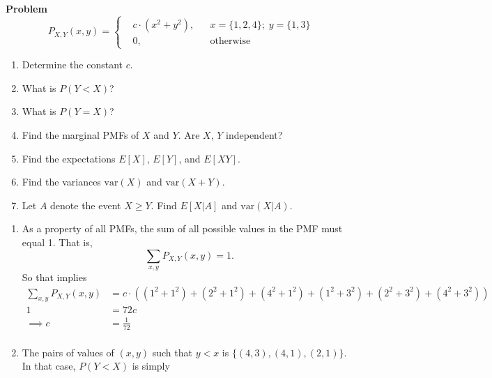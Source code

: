 \documentclass[12pt]{article}
\newenvironment{Ex}{\textbf{Problem}\vspace{.75em}\\}{}
\begin{document}
\begin{enumerate}
\begin{Ex}
\begin{equation*}
      \label{eq:2-question}
      P_{X,Y}(x,y) = \left\{
        \begin{aligned}
          & c \cdot (x^2 + y^2), && x=\{1,2,4\};\; y=\{1,3\} \\
          & 0, && \text{otherwise}
        \end{aligned}
      \right.
    \end{equation*}
    \begin{enumerate}
    \item Determine the constant $c$.
    \item What is $P(Y<X)$?
    \item What is $P(Y=X)$?
    \item Find the marginal PMFs of $X$ and $Y$. Are $X$, $Y$
      independent?
    \item Find the expectations $E[X]$, $E[Y]$, and $E[XY]$.
    \item Find the variances $\text{var}(X)$ and $\text{var}(X +Y)$.
    \item Let $A$ denote the event $X \ge Y$. Find $E[X|A]$ and
      $\text{var}(X|A)$.
    \end{enumerate}
    \begin{solution} \hfill
      \begin{enumerate}
      \item As a property of all PMFs, the sum of all possible
        values in the PMF must equal 1. That is,
        \begin{equation}
          \label{eq:2a-pmf-sum}
          \sum_{x,y} P_{X,Y}(x,y) = 1.
        \end{equation}
        So that implies
        \begin{equation}
          \label{eq:2a-pmf-sum-actual}
          \begin{aligned}
            \sum_{x,y} P_{X,Y}(x,y) &= c\cdot((1^2+1^2) + (2^2+1^2) +
            (4^2+1^2) + (1^2+3^2) + (2^2+3^2) + (4^2+3^2)) \\
            1 &= 72c \\
            \implies c&=\frac{1}{72} \\
          \end{aligned}
        \end{equation}
      \item The pairs of values of $(x,y)$ such that $y < x$
        is $\{(4,3),(4,1),(2,1)\}$. In that case, $P(Y < X)$ is
        simply
        \begin{equation}
          \label{eq:2b-sol}
          \begin{aligned}

\end{aligned}
\end{equation}
\end{enumerate}
\end{solution}
\end{Ex}
\end{enumerate}
\end{document}
